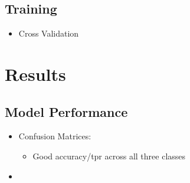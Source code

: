 \documentclass{article}
\begin{document}
\subsection{Training}
\begin{itemize}
    \item Cross Validation
\end{itemize}

\section{Results} \label{sec:results}

\subsection{Model Performance}

\begin{itemize}
    \item Confusion Matrices:
    \begin{itemize}
        \item Good accuracy/tpr across all three classes
    \end{itemize}
    \item 
\end{itemize}
\end{document}
